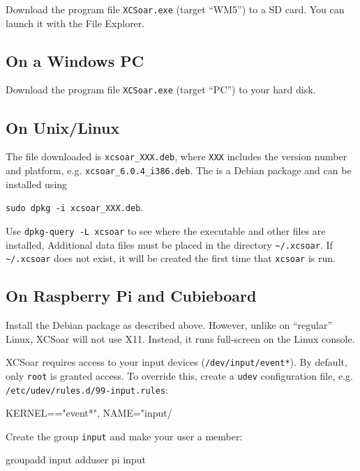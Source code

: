 Download the program file \verb|XCSoar.exe| (target ``WM5'') to a SD
card.  You can launch it with the File Explorer.

\subsection*{On a Windows PC}

Download the program file \verb|XCSoar.exe| (target ``PC'') to your
hard disk.

\subsection*{On Unix/Linux}

The file downloaded is \verb|xcsoar_XXX.deb|, where \verb|XXX| includes
the version number and platform, e.g. \verb|xcsoar_6.0.4_i386.deb|.
The is a Debian package and can be installed using 
\begin{center}
\verb|sudo dpkg -i xcsoar_XXX.deb|.
\end{center}
Use \verb|dpkg-query -L xcsoar| to see where the executable and 
other files are installed,
Additional data files must be placed in the directory
\verb|~/.xcsoar|.
If \verb|~/.xcsoar| does not exist, it will be created the first time
that \verb|xcsoar| is run.

\subsection*{On Raspberry Pi and Cubieboard}

Install the Debian package as described above.  However, unlike on
``regular'' Linux, XCSoar will not use X11.  Instead, it runs
full-screen on the Linux console.

XCSoar requires access to your input devices
(\texttt{/dev/input/event*}).  By default, only \texttt{root} is
granted access.  To override this, create a \texttt{udev}
configuration file, e.g. \texttt{/etc/udev/rules.d/99-input.rules}:

\begin{verbatim*}
KERNEL=="event*", NAME="input/%k", MODE="660", GROUP="input"
\end{verbatim*}

Create the group \texttt{input} and make your user a member:

\begin{verbatim*}
groupadd input
adduser pi input
\end{verbatim*}

